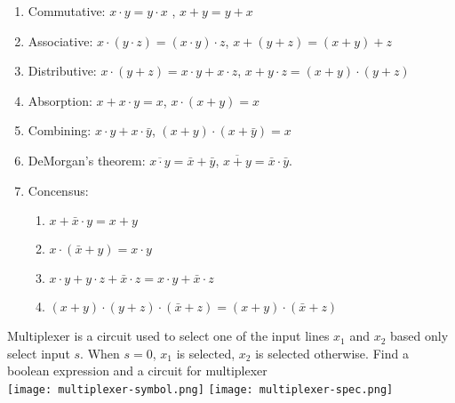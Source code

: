 \begin{enumerate}
\item Commutative: $x\cdot y = y \cdot x$ , $x + y = y + x$
  \vspace{10em}
\item Associative: $x\cdot(y\cdot z) = (x \cdot y) \cdot z$, $x+(y+ z) = (x + y) + z$
  \vspace{10em}
\item Distributive: $x\cdot(y + z) = x \cdot y + x \cdot z$, $x + y \cdot z = (x + y) \cdot (y + z)$
  \vspace{10em}
\item Absorption: $x + x\cdot y = x$, $x \cdot (x+y) = x$
  \vspace{10em}
\item Combining: $x \cdot y + x \cdot \bar{y}$, $(x+y) \cdot (x + \bar{y}) = x$
  \vspace{10em}
\item DeMorgan's theorem: $\overline{x \cdot y} = \bar{x} + \bar{y}$,
  $\overline{x + y} = \bar{x} \cdot \bar{y}$.
  \vspace{10em}
\item Concensus:
  \begin{enumerate}
  \item $x + \bar{x}\cdot y = x + y$
    \vspace{10em}
  \item $x \cdot (\bar{x} + y) = x \cdot y$
    \vspace{10em}
  \item $x \cdot y + y\cdot z + \bar{x} \cdot z = x\cdot y + \bar{x} \cdot z$
    \vspace{10em}
  \item $(x + y) \cdot (y+ z) \cdot (\bar{x} + z) = (x+ y) \cdot (\bar{x} + z)$
    \vspace{10em}
  \end{enumerate}
\end{enumerate}



\begin{example}[Multiplexer]
  Multiplexer is a circuit used to select one of the input lines $x_1$ and $x_2$
  based only select input $s$. When $s=0$, $x_1$ is selected, $x_2$ is selected otherwise.
  Find a boolean expression and a circuit for multiplexer\\
  \texttt{[image: multiplexer-symbol.png]}
  \texttt{[image: multiplexer-spec.png]}
\end{example}
\vspace{10em}

